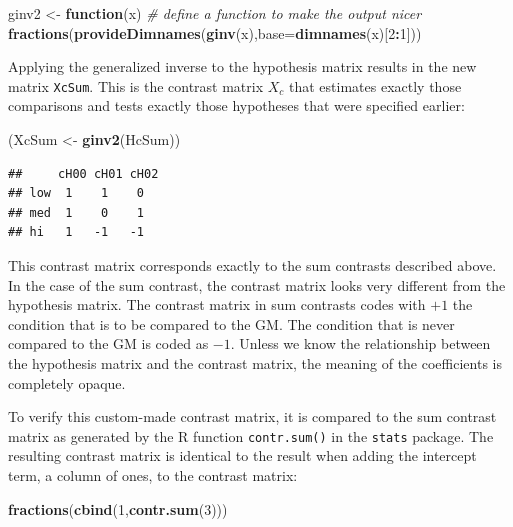 \documentclass[12pt,]{krantz}
\newenvironment{Shaded}{\begin{snugshade}}{\end{snugshade}}
\newcommand{\CommentTok}[1]{\textcolor[rgb]{0.56,0.35,0.01}{\textit{#1}}}
\newcommand{\ControlFlowTok}[1]{\textcolor[rgb]{0.13,0.29,0.53}{\textbf{#1}}}
\newcommand{\DataTypeTok}[1]{\textcolor[rgb]{0.13,0.29,0.53}{#1}}
\newcommand{\DecValTok}[1]{\textcolor[rgb]{0.00,0.00,0.81}{#1}}
\newcommand{\KeywordTok}[1]{\textcolor[rgb]{0.13,0.29,0.53}{\textbf{#1}}}
\newcommand{\NormalTok}[1]{#1}
\newcommand{\OperatorTok}[1]{\textcolor[rgb]{0.81,0.36,0.00}{\textbf{#1}}}
\newcommand{\StringTok}[1]{\textcolor[rgb]{0.31,0.60,0.02}{#1}}
\begin{document}
\begin{Shaded}
\begin{Highlighting}[]
\NormalTok{ginv2 <-}\StringTok{ }\ControlFlowTok{function}\NormalTok{(x) }\CommentTok{# define a function to make the output nicer}
  \KeywordTok{fractions}\NormalTok{(}\KeywordTok{provideDimnames}\NormalTok{(}\KeywordTok{ginv}\NormalTok{(x),}\DataTypeTok{base=}\KeywordTok{dimnames}\NormalTok{(x)[}\DecValTok{2}\OperatorTok{:}\DecValTok{1}\NormalTok{]))}
\end{Highlighting}
\end{Shaded}

Applying the generalized inverse to the hypothesis matrix results in the new matrix \texttt{XcSum}. This is the contrast matrix \(X_c\) that estimates exactly those comparisons and tests exactly those hypotheses that were specified earlier:

\begin{Shaded}
\begin{Highlighting}[]
\NormalTok{(XcSum <-}\StringTok{ }\KeywordTok{ginv2}\NormalTok{(HcSum))}
\end{Highlighting}
\end{Shaded}

\begin{verbatim}
##     cH00 cH01 cH02
## low  1    1    0  
## med  1    0    1  
## hi   1   -1   -1
\end{verbatim}

This contrast matrix corresponds exactly to the sum contrasts described above. In the case of the sum contrast, the contrast matrix looks very different from the hypothesis matrix. The contrast matrix in sum contrasts codes with \(+1\) the condition that is to be compared to the GM. The condition that is never compared to the GM is coded as \(-1\). Unless we know the relationship between the hypothesis matrix and the contrast matrix, the meaning of the coefficients is completely opaque.

To verify this custom-made contrast matrix, it is compared to the sum contrast matrix as generated by the R function \texttt{contr.sum()} in the \texttt{stats} package. The resulting contrast matrix is identical to the result when adding the intercept term, a column of ones, to the contrast matrix:

\begin{Shaded}
\begin{Highlighting}[]
\KeywordTok{fractions}\NormalTok{(}\KeywordTok{cbind}\NormalTok{(}\DecValTok{1}\NormalTok{,}\KeywordTok{contr.sum}\NormalTok{(}\DecValTok{3}\NormalTok{)))}
\end{Highlighting}
\end{Shaded}
\end{document}
